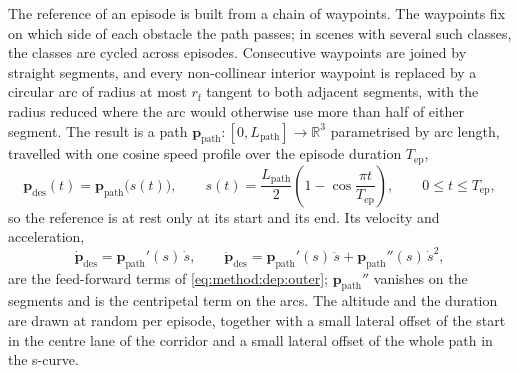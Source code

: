 \documentclass[headsepline,footsepline,footinclude=false,oneside,fontsize=11pt,paper=a4,listof=totoc,bibliography=totoc]{scrbook}
\theoremstyle{definition}
\theoremstyle{plain}
\theoremstyle{remark}
\newcommand{\vect}[1]{\boldsymbol{#1}}
\newcommand{\sidx}[1]{_{\textrm{#1}}}
\newcommand{\R}{\mathbb{R}}                    %
\begin{document}
The reference of an episode is built from a chain of waypoints. The waypoints fix on which side of each
obstacle the path passes; in scenes with several such classes, the classes are cycled across episodes.
Consecutive waypoints are joined by straight segments, and every non-collinear interior waypoint is
replaced by a circular arc of radius at most $r\sidx{f}$ tangent to both adjacent segments, with the
radius reduced where the arc would otherwise use more than half of either segment. The result is a
path $\vect{p}\sidx{path}:[0,L\sidx{path}]\to\R^{3}$ parametrised by arc length, travelled with one cosine
speed profile over the episode duration $T\sidx{ep}$,
\begin{equation}\label{eq:method:env:uavref}
  \vect{p}\sidx{des}(t) = \vect{p}\sidx{path}\big(s(t)\big),
  \qquad
  s(t) = \frac{L\sidx{path}}{2}\left(1-\cos\frac{\pi t}{T\sidx{ep}}\right),
  \qquad 0\le t\le T\sidx{ep},
\end{equation}
so the reference is at rest only at its start and its end. Its velocity and acceleration,
\begin{equation}\label{eq:method:env:uavrefderiv}
  \dot{\vect{p}}\sidx{des} = \vect{p}\sidx{path}'(s)\,\dot{s},
  \qquad
  \ddot{\vect{p}}\sidx{des} = \vect{p}\sidx{path}'(s)\,\ddot{s} + \vect{p}\sidx{path}''(s)\,\dot{s}^{2},
\end{equation}
are the feed-forward terms of \eqref{eq:method:dep:outer}; $\vect{p}\sidx{path}''$ vanishes on the segments
and is the centripetal term on the arcs. The altitude and the duration are drawn at random per
episode, together with a small lateral offset of the start in the centre lane of the corridor and a
small lateral offset of the whole path in the s-curve.
\end{document}
